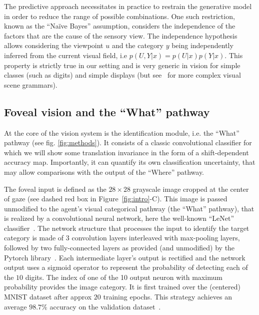 The predictive approach necessitates in practice to restrain the generative model in order to reduce the range of possible combinations. One such restriction, known as the ``Naïve Bayes'' assumption, considers the independence of the factors that are the cause of the sensory view.
The independence hypothesis allows considering the viewpoint $u$ and the category $y$ being independently inferred from the current visual field, i.e $p(U,Y|x) = p(U|x) p(Y|x)$. This property is strictly true in our setting and is very generic in vision for simple classes (such as digits) and simple displays (but see~\cite{Vo12} for more complex visual scene grammars).
%

%
\subsection{Foveal vision and the ``What'' pathway}
%
At the core of the vision system is the identification module, i.e. the ``What'' pathway (see fig. \ref{fig:methods}). It consists of a classic convolutional classifier for which we will show some translation invariance in the form of a shift-dependent accuracy map. Importantly, it can quantify its own classification uncertainty, that may allow comparisons with the output of the ``Where'' pathway.

The foveal input is defined as the $28\times 28$ grayscale image cropped at the center of gaze (see dashed red box in Figure~\ref{fig:intro}-C).
This image is passed unmodified to the agent's visual categorical pathway (the ``What'' pathway), that is realized by a convolutional neural network, here the well-known ``LeNet'' classifier~\cite{Lecun1998}. The network structure that processes the input to identify the target category is made of 3 convolution layers interleaved with max-pooling layers, followed by two fully-connected layers as provided (and unmodified) by the Pytorch library~\cite{NEURIPS2019_9015}. Each intermediate layer's output is rectified and
the network output uses a sigmoid operator to represent the probability of detecting each of the $10$ digits. The index of one of the 10 output neuron with maximum probability provides the image category.
It is first trained over the (centered) MNIST dataset after approx $20$ training epochs. %
This strategy achieves an average $98.7\%$ accuracy on the validation dataset~\cite{Lecun1998}.%


